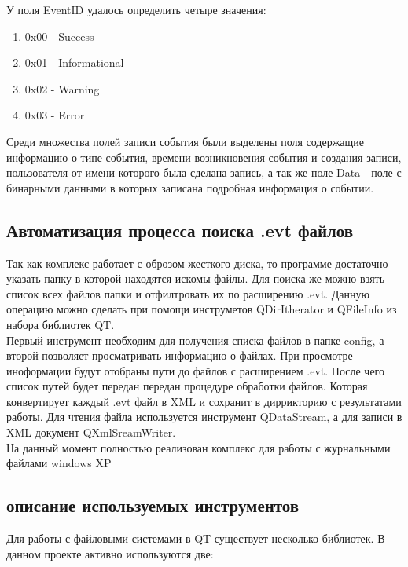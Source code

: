 У поля EventID удалось определить четыре значения: \\

\begin{enumerate}
\item 0x00 - Success
\item 0x01 - Informational
\item 0x02 - Warning
\item 0x03 - Error
\end{enumerate}

Среди множества полей записи события были выделены поля содержащие информацию о типе события, времени возникновения события и создания записи, пользователя от имени которого была сделана запись, а так же поле Data - поле с бинарными данными в которых записана подробная информация о событии. \\

\subsection{Автоматизация процесса поиска .evt файлов}

Так как комплекс работает с оброзом жесткого диска, то программе достаточно указать папку в которой находятся искомы файлы. Для поиска же можно взять список всех файлов папки и отфилтровать их по расширению .evt. Данную операцию можно сделать при помощи инструметов QDirItherator и QFileInfo из набора библиотек QT. \\

Первый инструмент необходим для получения списка файлов в папке config, а второй позволяет просматривать информацию о файлах. При просмотре иноформации будут отобраны пути до файлов с расширением .evt. После чего список путей будет передан передан процедуре обработки файлов. Которая конвертирует каждый .evt файл в XML и сохранит в диррикторию с результатами работы. Для чтения файла используется инструмент QDataStream, а для записи в XML документ QXmlSreamWriter. \\ 


На данный момент полностью реализован комплекс для работы с журнальными файлами windows XP\\

\subsection{описание используемых инструментов}

Для работы с файловыми системами в QT существует несколько библиотек. В данном проекте активно используются две: \\

